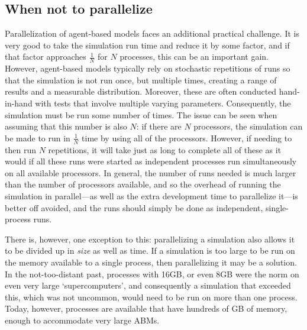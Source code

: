 \subsection{When not to parallelize}

Parallelization of agent-based models faces an additional practical challenge. It is very good to take the simulation run time and reduce it by some factor, and if that factor approaches $\frac{1}{N}$ for $N$ processes, this can be an important gain. However, agent-based models typically rely on stochastic repetitions of runs so that the simulation is not run once, but multiple times, creating a range of results and a measurable distribution. Moreover, these are often conducted hand-in-hand with tests that involve multiple varying parameters. Consequently, the simulation must be run some number of times. The issue can be seen when assuming that this number is also $N$: if there are $N$ processors, the simulation can be made to run in $\frac{1}{N}$ time by using all of the processors. 
However, if needing to then run $N$ repetitions, it will take just as long to complete all of these as it would if all these runs were started as independent processes run simultaneously on all available processors. In general, the number of runs needed is much larger than the number of processors available, and so the overhead of running the simulation in parallel---as well as the extra development time to parallelize it---is better off avoided, and the runs should simply be done as independent, single-process runs.

There is, however, one exception to this: parallelizing a simulation also allows it to be divided up in \textit{size} as well as time. If a simulation is too large to be run on the memory available to a single process, then parallelizing it may be a solution. In the not-too-distant past, processes with 16GB, or even 8GB were the norm on even very large `supercomputers', and consequently a simulation that exceeded this, which was not uncommon, would need to be run on more than one process. Today, however, processes are available that have hundreds of GB of memory, enough to accommodate very large ABMs.

